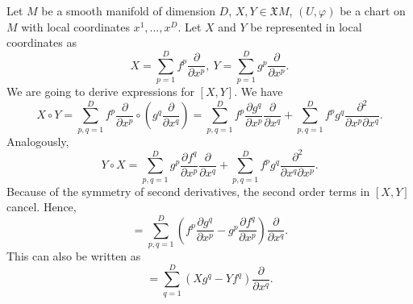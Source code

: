 \begin{discussion}
  Let $M$ be a smooth manifold of dimension $D$,
  $X, Y \in \mathfrak{X} M$,
  $(U, \varphi)$ be a chart on $M$ with local coordinates $x^1, ..., x^D$.
  Let $X$ and $Y$ be represented in local coordinates as
  \begin{equation}
    X = \sum_{p = 1}^D f^p \frac{\partial}{\partial x^p},\
    Y = \sum_{p = 1}^D g^p \frac{\partial}{\partial x^p}.
  \end{equation}
  We are going to derive expressions for $[X, Y]$.
  We have
  \begin{equation}
    X \circ Y
    = \sum_{p, q = 1}^D f^p \frac{\partial}{\partial x^p} \circ
      (g^q \frac{\partial}{\partial x^q})
    = \sum_{p, q = 1}^D f^p \frac{\partial g^q}{\partial x^p}
        \frac{\partial}{\partial x^q}
      + \sum_{p, q = 1}^D f^p g^q \frac{\partial^2}{\partial x^p \partial x^q}.
  \end{equation}
  Analogously,
  \begin{equation}
    Y \circ X
    = \sum_{p, q = 1}^D g^p \frac{\partial f^q}{\partial x^p}
        \frac{\partial}{\partial x^q}
      + \sum_{p, q = 1}^D f^p g^q \frac{\partial^2}{\partial x^q \partial x^p}.
  \end{equation}
  Because of the symmetry of second derivatives, the second order terms in
  $[X, Y]$ cancel.
  Hence,
  \begin{equation}
    [X, Y]
    = \sum_{p, q = 1}^D
        (f^p \frac{\partial g^q}{\partial x^p}
         - g^p \frac{\partial f^q}{\partial x^p})
        \frac{\partial}{\partial x^q}.
  \end{equation}
  This can also be written as
  \begin{equation}
    [X, Y] = \sum_{q = 1}^D (X g^q - Y f^q) \frac{\partial}{\partial x^q}.
  \end{equation}
\end{discussion}
